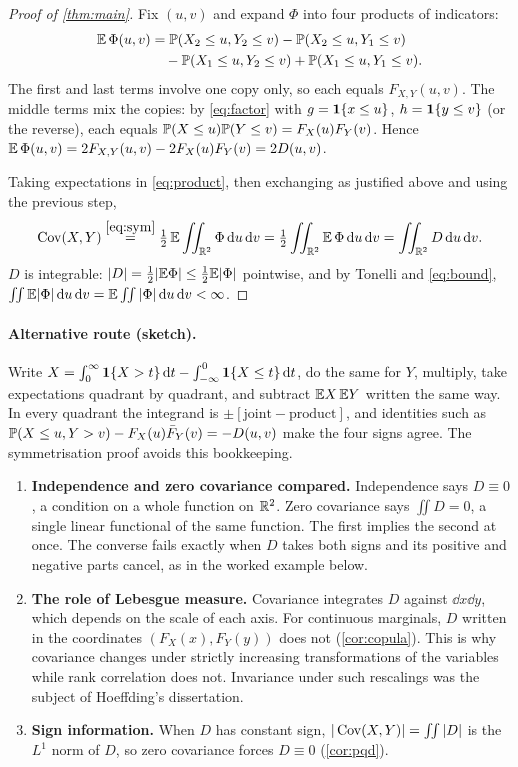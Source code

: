 \documentclass{saim-blog}
\begin{document}
\begin{proof}[Proof of \cref{thm:main}]
Fix $(u,v)$ and expand $\Phi$ into four products of indicators:
\[
\begin{aligned}
\mathbb{E}\,\Phi(u,v)
&=\mathbb{P}(X_2\le u,Y_2\le v)-\mathbb{P}(X_2\le u,Y_1\le v)\\
&\quad-\mathbb{P}(X_1\le u,Y_2\le v)+\mathbb{P}(X_1\le u,Y_1\le v).
\end{aligned}
\]
The first and last terms involve one copy only, so each equals $F_{X,Y}(u,v)$. The middle terms mix the copies: by \eqref{eq:factor} with $g=\mathbf{1}\{x\le u\}$, $h=\mathbf{1}\{y\le v\}$ (or the reverse), each equals $\mathbb{P}(X\le u)\mathbb{P}(Y\le v)=F_X(u)F_Y(v)$. Hence $\mathbb{E}\,\Phi(u,v)=2F_{X,Y}(u,v)-2F_X(u)F_Y(v)=2D(u,v)$.

Taking expectations in \eqref{eq:product}, then exchanging as justified above and using the previous step,
\[
\operatorname{Cov}(X,Y)\overset{\eqref{eq:sym}}{=}\tfrac12\,\mathbb{E}\iint_{\mathbb{R}^2}\Phi\mathop{}\!\mathrm{d} u\mathop{}\!\mathrm{d} v=\tfrac12\iint_{\mathbb{R}^2}\mathbb{E}\,\Phi\mathop{}\!\mathrm{d} u\mathop{}\!\mathrm{d} v=\iint_{\mathbb{R}^2}D\mathop{}\!\mathrm{d} u\mathop{}\!\mathrm{d} v .
\]
$D$ is integrable: $|D|=\tfrac12|\mathbb{E}\Phi|\le\tfrac12\mathbb{E}|\Phi|$ pointwise, and by Tonelli and \eqref{eq:bound}, $\iint\mathbb{E}|\Phi|\mathop{}\!\mathrm{d} u\mathop{}\!\mathrm{d} v=\mathbb{E}\iint|\Phi|\mathop{}\!\mathrm{d} u\mathop{}\!\mathrm{d} v<\infty$.
\end{proof}

\paragraph{Alternative route (sketch).}
Write $X=\int_0^\infty\mathbf{1}\{X>t\}\mathop{}\!\mathrm{d} t-\int_{-\infty}^0\mathbf{1}\{X\le t\}\mathop{}\!\mathrm{d} t$, do the same for $Y$, multiply, take expectations quadrant by quadrant, and subtract $\mathbb{E} X\,\mathbb{E} Y$ written the same way. In every quadrant the integrand is $\pm[\text{joint}-\text{product}]$, and identities such as $\mathbb{P}(X\le u,Y>v)-F_X(u)\bar F_Y(v)=-D(u,v)$ make the four signs agree. The symmetrisation proof avoids this bookkeeping.

\SecInsight

\begin{enumerate}
\item \textbf{Independence and zero covariance compared.} Independence says $D\equiv0$, a condition on a whole function on $\mathbb{R}^2$. Zero covariance says $\iint D=0$, a single linear functional of the same function. The first implies the second at once. The converse fails exactly when $D$ takes both signs and its positive and negative parts cancel, as in the worked example below.
\item \textbf{The role of Lebesgue measure.} Covariance integrates $D$ against $\dd x\dd y$, which depends on the scale of each axis. For continuous marginals, $D$ written in the coordinates $(F_X(x),F_Y(y))$ does not (\cref{cor:copula}). This is why covariance changes under strictly increasing transformations of the variables while rank correlation does not. Invariance under such rescalings was the subject of Hoeffding's dissertation.
\item \textbf{Sign information.} When $D$ has constant sign, $|\operatorname{Cov}(X,Y)|=\iint|D|$ is the $L^1$ norm of $D$, so zero covariance forces $D\equiv0$ (\cref{cor:pqd}).
\end{enumerate}
\end{document}
